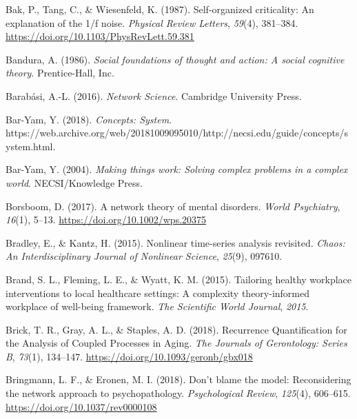 \documentclass[
  british,
  man,floatsintext]{apa6}
\begin{document}
\leavevmode\hypertarget{ref-bakSelforganizedCriticalityExplanation1987}{}%
Bak, P., Tang, C., \& Wiesenfeld, K. (1987). Self-organized criticality: An explanation of the 1/f noise. \emph{Physical Review Letters}, \emph{59}(4), 381--384. \url{https://doi.org/10.1103/PhysRevLett.59.381}

\leavevmode\hypertarget{ref-banduraSocialFoundationsThought1986}{}%
Bandura, A. (1986). \emph{Social foundations of thought and action: A social cognitive theory}. Prentice-Hall, Inc.

\leavevmode\hypertarget{ref-barabasiNetworkScience2016}{}%
Barabási, A.-L. (2016). \emph{Network Science}. Cambridge University Press.

\leavevmode\hypertarget{ref-bar-yamConceptsSystem2018}{}%
Bar-Yam, Y. (2018). \emph{Concepts: System}. https://web.archive.org/web/20181009095010/http://necsi.edu/guide/concepts/system.html.

\leavevmode\hypertarget{ref-bar-yamMakingThingsWork2004}{}%
Bar-Yam, Y. (2004). \emph{Making things work: Solving complex problems in a complex world}. NECSI/Knowledge Press.

\leavevmode\hypertarget{ref-borsboomNetworkTheoryMental2017}{}%
Borsboom, D. (2017). A network theory of mental disorders. \emph{World Psychiatry}, \emph{16}(1), 5--13. \url{https://doi.org/10.1002/wps.20375}

\leavevmode\hypertarget{ref-bradleyNonlinearTimeseriesAnalysis2015}{}%
Bradley, E., \& Kantz, H. (2015). Nonlinear time-series analysis revisited. \emph{Chaos: An Interdisciplinary Journal of Nonlinear Science}, \emph{25}(9), 097610.

\leavevmode\hypertarget{ref-brandTailoringHealthyWorkplace2015}{}%
Brand, S. L., Fleming, L. E., \& Wyatt, K. M. (2015). Tailoring healthy workplace interventions to local healthcare settings: A complexity theory-informed workplace of well-being framework. \emph{The Scientific World Journal}, \emph{2015}.

\leavevmode\hypertarget{ref-brickRecurrenceQuantificationAnalysis2018}{}%
Brick, T. R., Gray, A. L., \& Staples, A. D. (2018). Recurrence Quantification for the Analysis of Coupled Processes in Aging. \emph{The Journals of Gerontology: Series B}, \emph{73}(1), 134--147. \url{https://doi.org/10.1093/geronb/gbx018}

\leavevmode\hypertarget{ref-bringmannDonBlameModel2018a}{}%
Bringmann, L. F., \& Eronen, M. I. (2018). Don't blame the model: Reconsidering the network approach to psychopathology. \emph{Psychological Review}, \emph{125}(4), 606--615. \url{https://doi.org/10.1037/rev0000108}
\end{document}
